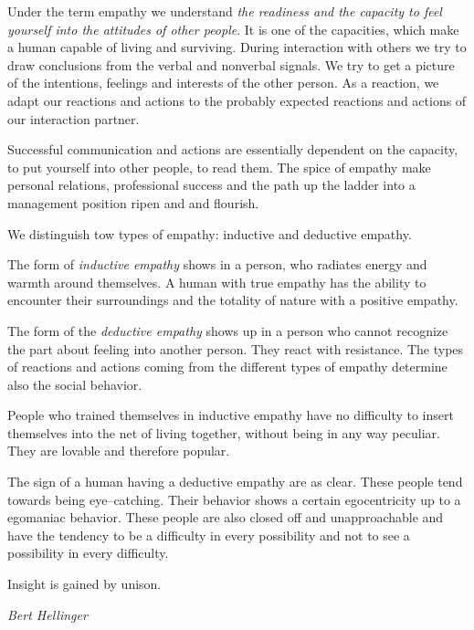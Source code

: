 \documentclass[../main.tex]{subfiles}
\begin{document}
Under the term empathy we understand \emph{the readiness and the capacity to feel yourself into the attitudes of other people}.
It is one of the capacities, which make a human capable of living and surviving.
During interaction with others we try to draw conclusions from the verbal and nonverbal signals.
We try to get a picture of the intentions, feelings and interests of the other person.
As a reaction, we adapt our reactions and actions to the probably expected reactions and actions of our interaction partner.

Successful communication and actions are essentially dependent on the capacity, to put yourself into other people, to read them.
The spice of empathy make personal relations, professional success and the path up the ladder into a management position ripen and and flourish.

We distinguish tow types of empathy: inductive and deductive empathy.

The form of \emph{inductive empathy}  shows in a person, who radiates energy and warmth around themselves.
A human with true empathy has the ability to encounter their surroundings and the totality of nature with a positive empathy.

The form of the \emph{deductive empathy} shows up in a person who cannot recognize the part about feeling into another person.
They react with resistance.
The types of reactions and actions coming from the different types of empathy determine also the social behavior.

People who trained themselves in inductive empathy have no difficulty to insert themselves into the net of living together, without being in any way peculiar.
They are lovable and therefore popular.

The sign of a human having a deductive empathy are as clear.
These people tend towards being eye--catching.
Their behavior shows a certain egocentricity up to a egomaniac behavior.
These people are also closed off and unapproachable and have the tendency to be a difficulty in every possibility and not to see a possibility in every difficulty.

\epigraph{Insight is gained by unison.}{\textit{Bert Hellinger}}
\end{document}

